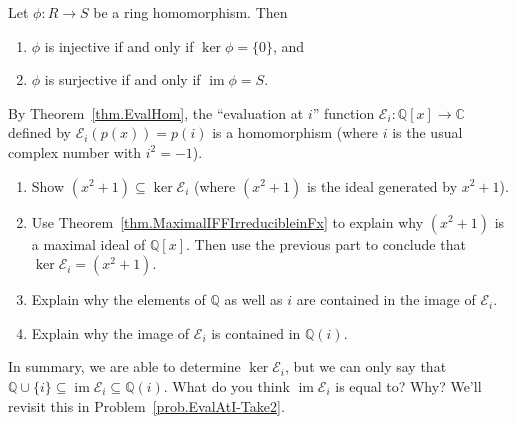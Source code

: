 \begin{theorem}\label{thm.HomInjectiveSurjective}
Let $\phi:R\to S$ be a ring homomorphism. Then
\begin{enumerate}
\item $\phi$ is injective if and only if $\ker \phi = \{0\}$, and 
\item $\phi$ is surjective if and only if $\operatorname{im}\phi = S$.
\end{enumerate}
\end{theorem}

\begin{problem}\label{prob.EvalAtI}
By Theorem~\ref{thm.EvalHom}, the ``evaluation at $i$'' function $\mathcal{E}_{i}:\mathbb{Q}[x]\rightarrow\mathbb{C}$ defined by $\mathcal{E}_{i}(p(x)) = p(i)$ is a homomorphism (where $i$ is the usual complex number with $i^2 = -1$).
\begin{enumerate}
\item Show $(x^2+1)\subseteq\ker \mathcal{E}_{i}$ (where $(x^2 + 1)$ is the ideal generated by $x^2 + 1$).
\item Use Theorem~\ref{thm.MaximalIFFIrreducibleinFx} to explain why $(x^2 + 1)$ is a maximal ideal of $\mathbb{Q}[x]$. Then use the previous part to conclude that $\ker \mathcal{E}_{i} = (x^2 + 1)$.
\item Explain why the elements of $\mathbb{Q}$ as well as $i$ are contained in the image of $\mathcal{E}_{i}$.
\item Explain why the image of $\mathcal{E}_{i}$ is contained in $\mathbb{Q}(i)$.
\end{enumerate}
In summary, we are able to determine $\ker \mathcal{E}_{i}$, but we can only say that $\mathbb{Q}\cup\{i\} \subseteq \operatorname{im} \mathcal{E}_{i} \subseteq \mathbb{Q}(i)$. What do you think $\operatorname{im} \mathcal{E}_{i}$ is equal to? Why? We'll revisit this in Problem~\ref{prob.EvalAtI-Take2}.
\end{problem}

